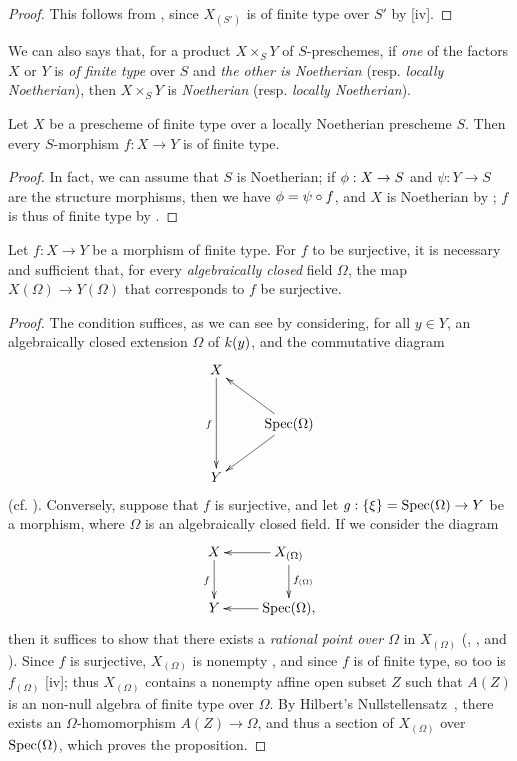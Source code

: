 \begin{proof}
\label{proof-1.6.3.8}
This follows from , since $X_{(S')}$ is of finite type over $S'$ by [iv].
\end{proof}

We can also says that, for a product $X\times_S Y$ of $S$-preschemes, if \emph{one} of the factors
$X$ or $Y$ is \emph{of finite type} over $S$ and \emph{the other is Noetherian} (resp. \emph{locally Noetherian}), then $X\times_S Y$ is \emph{Noetherian} (resp. \emph{locally Noetherian}).

\begin{corollary}[6.3.9]
\label{I.6.3.9}
Let $X$ be a prescheme of finite type over a locally Noetherian prescheme $S$.
Then every $S$-morphism $f:X\to Y$ is of finite type.
\end{corollary}

\begin{proof}
\label{proof-1.6.3.9}
In fact, we can assume that $S$ is Noetherian;
if $\vphi:X\to S$ and $\psi:Y\to S$ are the structure morphisms, then we have $\phi=\psi\circ f$, and $X$ is Noetherian by ;
$f$ is thus of finite type by .
\end{proof}

\begin{proposition}[6.3.10]
\label{I.6.3.10}
Let $f:X\to Y$ be a morphism of finite type.
For $f$ to be surjective, it is necessary and sufficient that, for every \emph{algebraically closed} field $\Omega$, the map $X(\Omega)\to Y(\Omega)$ that corresponds to $f$  be surjective.
\end{proposition}

\begin{proof}
\label{proof-1.6.3.10}
The condition suffices, as we can see by considering, for all $y\in Y$, an algebraically closed extension $\Omega$ of $k(y)$, and the commutative diagram
\[
  \xymatrix{
    X\ar[dd]_f\\
    & \Spec(\Omega)\ar[ul]\ar[dl]\\
    Y
  }
\]
(cf. ).
Conversely, suppose that $f$ is surjective, and let $g:\{\xi\}=\Spec(\Omega)\to Y$ be a morphism, where $\Omega$ is an algebraically closed field.
If we consider the diagram
\[
  \xymatrix{
    X\ar[d]_f &
    X_{(\Omega)}\ar[l]\ar[d]^{f_{(\Omega)}}\\
    Y &
    \Spec(\Omega),\ar[l]
  }
\]
then it suffices to show that there exists a \emph{rational point over $\Omega$} in $X_{(\Omega)}$ (, , and ).
Since $f$ is surjective, $X_{(\Omega)}$ is nonempty , and since $f$ is of finite type, so too is $f_{(\Omega)}$ [iv];
thus $X_{(\Omega)}$ contains a nonempty affine open subset $Z$ such that $A(Z)$ is an non-null algebra of finite type over $\Omega$.
By Hilbert's Nullstellensatz~\cite{I-21}, there exists an $\Omega$-homomorphism $A(Z)\to\Omega$, and thus a section of $X_{(\Omega)}$ over $\operatorname{Spec}(\Omega)$, which proves the proposition.
\end{proof}

